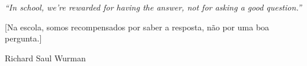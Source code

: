 \textit{``In school, we're rewarded for having the answer, not for asking a good question.''}

[Na escola, somos recompensados por saber a resposta, não por uma boa pergunta.]

\vspace{12pt}

Richard Saul Wurman